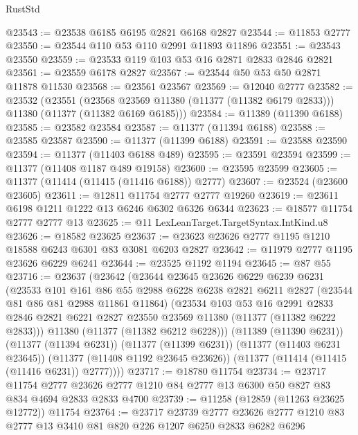 \begin{lexlean}{RustStd}
\begin{coremodule}
@23543 := @23538 @6185 @6195 @2821 @6168 @2827
@23544 := @11853 @2777
@23550 := @23544 @110 @53 @110 @2991 @11893 @11896
@23551 := @23543 @23550
@23559 := @23533 @119 @103 @53 @16 @2871 @2833 @2846 @2821
@23561 := @23559 @6178 @2827
@23567 := @23544 @50 @53 @50 @2871 @11878 @11530
@23568 := @23561 @23567
@23569 := @12040 @2777
@23582 := @23532
    (@23551
      (@23568 @23569 @11380 (@11377 (@11382 @6179 @2833)))
      @11380
      (@11377 (@11382 @6169 @6185)))
@23584 := @11389 (@11390 @6188)
@23585 := @23582 @23584
@23587 := @11377 (@11394 @6188)
@23588 := @23585 @23587
@23590 := @11377 (@11399 @6188)
@23591 := @23588 @23590
@23594 := @11377 (@11403 @6188 @489)
@23595 := @23591 @23594
@23599 := @11377 (@11408 @1187 @489 @19158)
@23600 := @23595 @23599
@23605 := @11377 (@11414 (@11415 (@11416 @6188)) @2777)
@23607 := @23524 (@23600 @23605)
@23611 := @12811 @11754 @2777 @2777 @19260
@23619 := @23611 @6198 @1211 @1222 @13 @6246 @6302 @6326 @6344
@23623 := @18577 @11754 @2777 @2777 @13
@23625 := @11 LexLeanTarget.TargetSyntax.IntKind.u8
@23626 := @18582 @23625
@23637 := @23623 @23626 @2777 @1195 @1210 @18588 @6243 @6301 @83 @3081 @6203 @2827
@23642 := @11979 @2777 @1195 @23626 @6229 @6241
@23644 := @23525 @1192 @1194
@23645 := @87 @55
@23716 := @23637
    (@23642
      (@23644
        @23645
        @23626
        @6229
        @6239
        @6231
        (@23533
          @101
          @161
          @86
          @55
          @2988
          @6228
          @6238
          @2821
          @6211
          @2827
          (@23544 @81 @86 @81 @2988 @11861 @11864)
          (@23534
            @103
            @53
            @16
            @2991
            @2833
            @2846
            @2821
            @6221
            @2827
            @23550
            @23569
            @11380
            (@11377 (@11382 @6222 @2833)))
          @11380
          (@11377 (@11382 @6212 @6228)))
        (@11389 (@11390 @6231))
        (@11377 (@11394 @6231))
        (@11377 (@11399 @6231))
        (@11377 (@11403 @6231 @23645))
        (@11377 (@11408 @1192 @23645 @23626))
        (@11377 (@11414 (@11415 (@11416 @6231)) @2777))))
@23717 := @18780 @11754
@23734 := @23717
    @11754
    @2777
    @23626
    @2777
    @1210
    @84
    @2777
    @13
    @6300
    @50
    @827
    @83
    @834
    @4694
    @2833
    @2833
    @4700
@23739 := @11258 (@12859 (@11263 @23625 @12772)) @11754
@23764 := @23717
    @23739
    @2777
    @23626
    @2777
    @1210
    @83
    @2777
    @13
    @3410
    @81
    @820
    @226
    @1207
    @6250
    @2833
    @6282
    @6296

\end{coremodule}
\end{lexlean}

